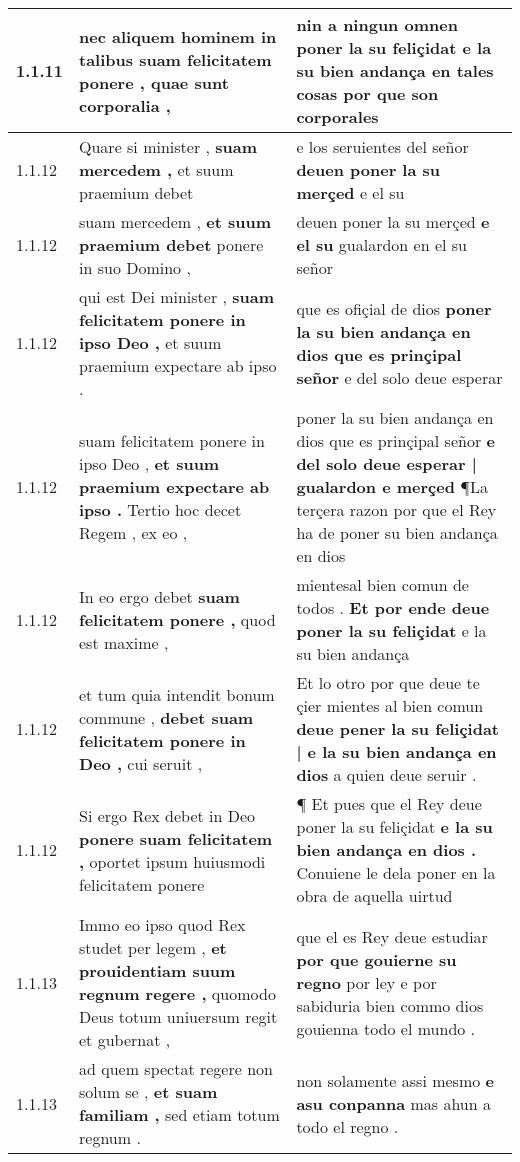 \begin{tabular}{|p{1cm}|p{6.5cm}|p{6.5cm}|}
1.1.11 & nec aliquem hominem in talibus \textbf{ suam felicitatem ponere , } quae sunt corporalia , & nin a ningun omnen poner la su feliçidat \textbf{ e la su bien andança en tales cosas } por que son corporales \\\hline
1.1.12 & Quare si minister , \textbf{ suam mercedem , } et suum praemium debet & e los seruientes del señor \textbf{ deuen poner la su merçed } e el su \\\hline
1.1.12 & suam mercedem , \textbf{ et suum praemium debet } ponere in suo Domino , & deuen poner la su merçed \textbf{ e el su } gualardon en el su señor \\\hline
1.1.12 & qui est Dei minister , \textbf{ suam felicitatem ponere in ipso Deo , } et suum praemium expectare ab ipso . & que es ofiçial de dios \textbf{ poner la su bien andança en dios que es prinçipal señor } e del solo deue esperar \\\hline
1.1.12 & suam felicitatem ponere in ipso Deo , \textbf{ et suum praemium expectare ab ipso . } Tertio hoc decet Regem , ex eo , & poner la su bien andança en dios que es prinçipal señor \textbf{ e del solo deue esperar | gualardon e merçed } ¶La terçera razon por que el Rey ha de poner su bien andança en dios \\\hline
1.1.12 & In eo ergo debet \textbf{ suam felicitatem ponere , } quod est maxime , & mientesal bien comun de todos . \textbf{ Et por ende deue poner la su feliçidat } e la su bien andança \\\hline
1.1.12 & et tum quia intendit bonum commune , \textbf{ debet suam felicitatem ponere in Deo , } cui seruit , & Et lo otro por que deue te çier mientes al bien comun \textbf{ deue pener la su feliçidat | e la su bien andança en dios } a quien deue seruir . \\\hline
1.1.12 & Si ergo Rex debet in Deo \textbf{ ponere suam felicitatem , } oportet ipsum huiusmodi felicitatem ponere & ¶ Et pues que el Rey deue poner la su feliçidat \textbf{ e la su bien andança en dios . } Conuiene le dela poner en la obra de aquella uirtud \\\hline
1.1.13 & Immo eo ipso quod Rex studet per legem , \textbf{ et prouidentiam suum regnum regere , } quomodo Deus totum uniuersum regit et gubernat , & que el es Rey deue estudiar \textbf{ por que gouierne su regno } por ley e por sabiduria bien commo dios gouienna todo el mundo . \\\hline
1.1.13 & ad quem spectat regere non solum se , \textbf{ et suam familiam , } sed etiam totum regnum . & non solamente assi mesmo \textbf{ e asu conpanna } mas ahun a todo el regno . \\\hline

\end{tabular}

